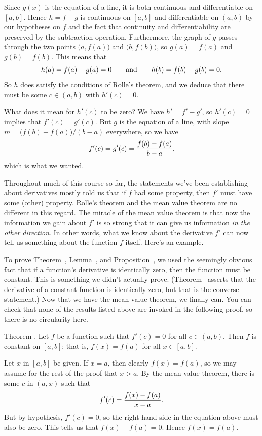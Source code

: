 Since $g(x)$ is the equation of a line, it is both continuous and differentiable on $[a,b]$.
Hence $h = f-g$ is continuous on $[a,b]$ and differentiable on $(a,b)$ by our hypotheses on $f$
and the fact that continuity and differentiability are preserved by the subtraction operation.
Furthermore, the graph of $g$ passes through the two points $\bigl(a, f(a)\bigr)$ and $\bigl(b, f(b)\bigr)$,
so $g(a) = f(a)$ and $g(b) = f(b)$. This means that
$$h(a) = f(a) - g(a) = 0\qquad\hbox{and}\qquad h(b) = f(b) - g(b) = 0.$$
So $h$ does satisfy the conditions of Rolle's theorem, and we deduce that there must be some $c\in (a,b)$
with $h'(c) = 0$.

What does it mean for $h'(c)$ to be zero? We have $h' = f' - g'$, so $h'(c) = 0$ implies
that $f'(c) = g'(c)$.
But $g$ is the equation of a line, with slope $m = \bigl( f(b) - f(a)\bigr) / (b-a)$ everywhere, so we have
$$f'(c) = g'(c) = {f(b) - f(a) \over b-a},$$
which is what we wanted.\slug

Throughout much of this course so far, the statements we've been establishing about derivatives
mostly told us that if
$f$ had some property, then $f'$ must have some (other) property. Rolle's theorem and the mean value
theorem are no different in this regard. The miracle of the mean value theorem is that now the information
we gain about $f'$ is so strong that it can give us information {\it in the other direction}. In other
words, what we know about the derivative $f'$ can now tell us something about the function $f$ itself.
Here's an example.

To prove
Theorem~{\thmexpdiffeq}, Lemma~{\lemtrigdiffeq}, and Proposition~{\prophyperbolicrules}, we used the
seemingly obvious
fact that if a function's derivative is identically zero, then the function must be constant.
This is something we didn't actually prove. (Theorem~{\thmconstantderiv} asserts that the derivative
of a constant function is identically
zero, but that is the converse statement.) Now that we have the mean value theorem,
we finally can. You can check that none of the results listed above are invoked in the following
proof, so there is no circularity here.

\edef\thmzeroderivimpliesconstant{\the\thmcount}
\proclaim Theorem \advthm. Let $f$ be a function such that $f'(c) = 0$ for all $c\in (a,b)$.
Then $f$ is constant on $[a,b]$; that is, $f(x) = f(a)$ for all
$x\in [a,b]$.

\proof Let $x$ in $[a,b]$ be given. If $x = a$, then clearly $f(x) = f(a)$, so we may assume
for the rest of the proof that $x>a$.
By the mean value theorem, there is some $c$ in $(a,x)$ such that
$$f'(c) = {f(x) - f(a)\over x-a}.$$
But by hypothesis, $f'(c) = 0$, so the right-hand side in the equation above must also be zero.
This tells us that $f(x) - f(a) = 0$. Hence $f(x) = f(a)$.\slug

